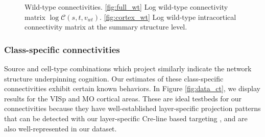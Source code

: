 \begin{figure}[H]
\centering
        \newline
   \caption{Wild-type connectivities.
   \ref{fig:full_wt} Log wild-type connectivity matrix $\log \mathcal {C} (s,t,v_{wt})$.
   \ref{fig:cortex_wt} Log wild-type intracortical connectivity matrix at the summary structure level.}
   \label{fig:connectome}
\end{figure}

\newpage
\subsubsection{Class-specific connectivities}

Source and cell-type combinations which project similarly indicate the network structure underpinning cognition.
Our estimates of these class-specific connectivities exhibit certain known behaviors.
In Figure \ref{fig:data_ct}, we display results for the VISp and MO cortical areas.
These are ideal testbeds for our connectivities because they have well-established layer-specific projection patterns that can be detected with our layer-specific Cre-line based targeting \citet{Jeong2016-dc}, and are also well-represented in our dataset.

